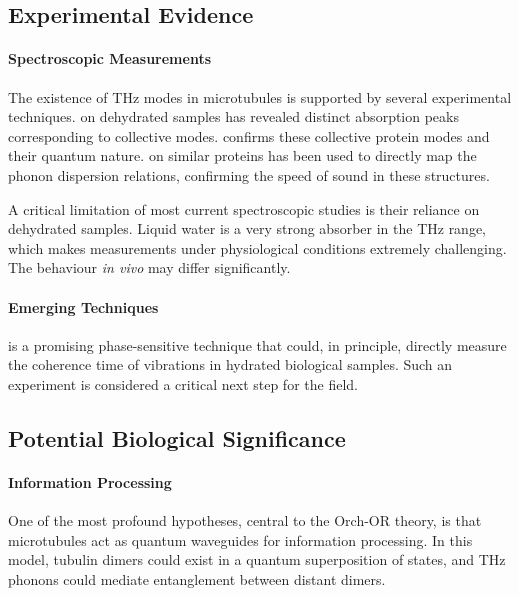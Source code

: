 \subsection{Experimental Evidence}

\paragraph{Spectroscopic Measurements}
The existence of THz modes in microtubules is supported by several experimental techniques.  on dehydrated samples has revealed distinct absorption peaks corresponding to collective modes.  confirms these collective protein modes and their quantum nature.  on similar proteins has been used to directly map the phonon dispersion relations, confirming the speed of sound in these structures.

\begin{warningbox}
    A critical limitation of most current spectroscopic studies is their reliance on dehydrated samples. Liquid water is a very strong absorber in the THz range, which makes measurements under physiological conditions extremely challenging. The behaviour \textit{in vivo} may differ significantly.
\end{warningbox}

\paragraph{Emerging Techniques}
 is a promising phase-sensitive technique that could, in principle, directly measure the coherence time of vibrations in hydrated biological samples. Such an experiment is considered a critical next step for the field.

\subsection{Potential Biological Significance}

\paragraph{Information Processing}
One of the most profound hypotheses, central to the Orch-OR theory, is that microtubules act as quantum waveguides for information processing. In this model, tubulin dimers could exist in a quantum superposition of states, and THz phonons could mediate entanglement between distant dimers.

